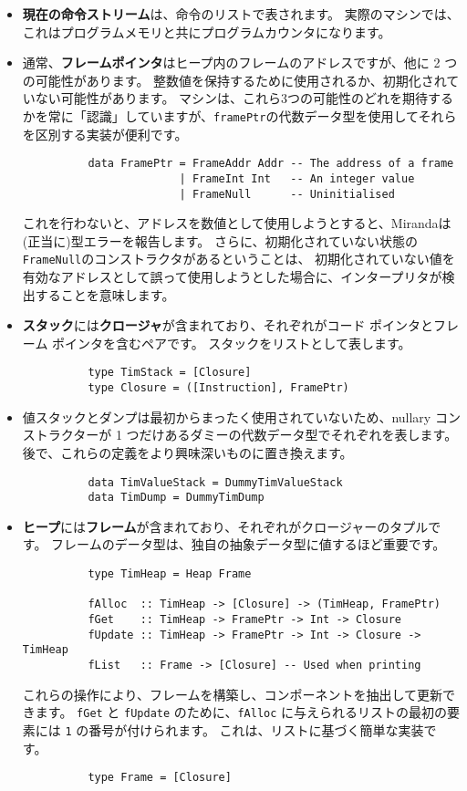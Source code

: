 \documentclass{jarticle}
\begin{document}
\begin{itemize}
	\item \textbf{現在の命令ストリーム}は、命令のリストで表されます。
	      実際のマシンでは、これはプログラムメモリと共にプログラムカウンタになります。
	\item 通常、\textbf{フレームポインタ}はヒープ内のフレームのアドレスですが、他に 2 つの可能性があります。
	      整数値を保持するために使用されるか、初期化されていない可能性があります。
	      マシンは、これら3つの可能性のどれを期待するかを常に「認識」していますが、\texttt{framePtr}の代数データ型を使用してそれらを区別する実装が便利です。
	      \begin{verbatim}
          data FramePtr = FrameAddr Addr -- The address of a frame
                        | FrameInt Int   -- An integer value
                        | FrameNull      -- Uninitialised
        \end{verbatim}
	      これを行わないと、アドレスを数値として使用しようとすると、Mirandaは(正当に)型エラーを報告します。
	      さらに、初期化されていない状態の \texttt{FrameNull}のコンストラクタがあるということは、
	      初期化されていない値を有効なアドレスとして誤って使用しようとした場合に、インタープリタが検出することを意味します。
	\item \textbf{スタック}には\textbf{クロージャ}が含まれており、それぞれがコード ポインタとフレーム ポインタを含むペアです。
	      スタックをリストとして表します。
	      \begin{verbatim}
          type TimStack = [Closure]
          type Closure = ([Instruction], FramePtr)
        \end{verbatim}
	\item 値スタックとダンプは最初からまったく使用されていないため、nullary コンストラクターが 1 つだけあるダミーの代数データ型でそれぞれを表します。
	      後で、これらの定義をより興味深いものに置き換えます。
	      \begin{verbatim}
          data TimValueStack = DummyTimValueStack
          data TimDump = DummyTimDump
        \end{verbatim}
	\item \textbf{ヒープ}には\textbf{フレーム}が含まれており、それぞれがクロージャーのタプルです。
	      フレームのデータ型は、独自の抽象データ型に値するほど重要です。
	      \begin{verbatim}
          type TimHeap = Heap Frame

          fAlloc  :: TimHeap -> [Closure] -> (TimHeap, FramePtr)
          fGet    :: TimHeap -> FramePtr -> Int -> Closure
          fUpdate :: TimHeap -> FramePtr -> Int -> Closure -> TimHeap
          fList   :: Frame -> [Closure] -- Used when printing
        \end{verbatim}
	      これらの操作により、フレームを構築し、コンポーネントを抽出して更新できます。
	      \texttt{fGet} と \texttt{fUpdate} のために、\texttt{fAlloc} に与えられるリストの最初の要素には \texttt{1} の番号が付けられます。
	      これは、リストに基づく簡単な実装です。
	      \begin{verbatim}
          type Frame = [Closure]


\end{verbatim}
\end{itemize}
\end{document}
